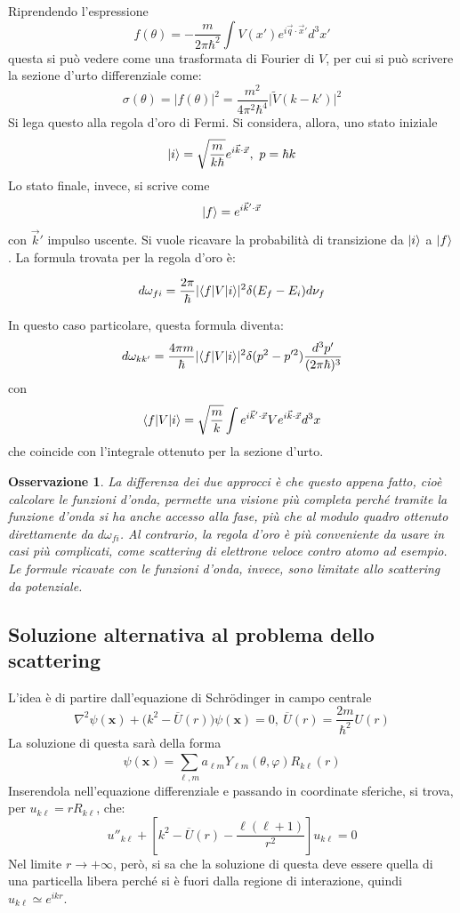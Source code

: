 \documentclass[11pt, a4paper]{scrartcl} %
\numberwithin{equation}{subsection}
\theoremstyle{style2}
\newtheorem{osservazione}{Osservazione}[section]
\theoremstyle{style1}
\newenvironment{boxenv}[1][]{
    \begin{eqbox}[#1]
    }{
   \end{eqbox}
}
\begin{document}
Riprendendo l'espressione
\[
f(\theta ) = - \frac{m}{2\pi \hbar ^2}\int V(x') e^{i \vec{q}\cdot \vec{x}'} d^3 x'
\] 
questa si pu\`o vedere come una trasformata di Fourier di $V$, per cui si pu\`o scrivere la sezione d'urto differenziale come:
\begin{equation}
	\sigma (\theta ) = \lvert f(\theta ) \rvert ^2 = \frac{m^2}{4 \pi ^2 \hbar ^4} \lvert \widetilde{V}(k-k') \rvert ^2
\end{equation}
Si lega questo alla regola d'oro di Fermi.
Si considera, allora, uno stato iniziale 
\[
\ket{i} = \sqrt{\frac{m}{k\hbar }} e^{i\vec{k}\cdot \vec{x}} , \ p = \hbar  k
\] 
Lo stato finale, invece, si scrive come
\[
\ket{f}  = e^{i \vec{k}' \cdot \vec{x}} 
\] 
con $\vec{k}'$ impulso uscente.
Si vuole ricavare la probabilit\`a di transizione da $\ket{i} $ a $\ket{f} $.
La formula trovata per la regola d'oro \`e:
\begin{boxenv}[]
\begin{equation}
d \omega_{fi} = \frac{2\pi}{\hbar }\lvert \braket{f|V|i}  \rvert ^2 \delta (E_f - E_i) d \nu _f
\end{equation}
\end{boxenv}
\noindent In questo caso particolare, questa formula diventa:
\begin{equation}\label{scop}
d \omega_{kk'}  = \frac{4\pi m }{\hbar } \lvert \braket{f|V|i}  \rvert ^2 \delta (p^2-p'^2) \frac{d^3 p'}{(2\pi \hbar )^3}
\end{equation}
con
\[
\braket{f|V|i}  = \sqrt{\frac{m}{k}} \int e^{i \vec{k}' \cdot \vec{x}} V e^{i\vec{k}\cdot \vec{x}} d^3 x
\] 
che coincide con l'integrale ottenuto per la sezione d'urto.
\begin{osservazione}
La differenza dei due approcci \`e che questo appena fatto, cio\`e calcolare le funzioni d'onda, permette una visione pi\`u completa perch\'e tramite la funzione d'onda si ha anche accesso alla fase, pi\`u che al modulo quadro ottenuto direttamente da $d\omega_{fi} $.
Al contrario, la regola d'oro \`e pi\`u conveniente da usare in casi pi\`u complicati, come scattering di elettrone veloce contro atomo ad esempio.
Le formule ricavate con le funzioni d'onda, invece, sono limitate allo scattering da potenziale.
\end{osservazione}
\subsection{Soluzione alternativa al problema dello scattering}
L'idea \`e di partire dall'equazione di Schr\"odinger in campo centrale
\[
\nabla ^2 \psi (\mathbf{x} ) + \big(k^2 - \overline{U}(r)\big) \psi (\mathbf{x} ) = 0, \ \overline{U}(r) = \frac{2m}{\hbar ^2}U(r)
\] 
La soluzione di questa sar\`a della forma
\[
\psi (\mathbf{x} ) = \sum_{\ell ,m}^{} a_{\ell m} Y_{\ell m} (\theta ,\varphi ) R_{k\ell } (r)
\] 
Inserendola nell'equazione differenziale e passando in coordinate sferiche, si trova, per $u _{k\ell } = r R_{k\ell } $, che:
\[
u'' _{k \ell } + \left[ k^2 - \overline{U}(r) - \frac{\ell (\ell +1)}{r^2} \right] u_{k\ell  } = 0 
\] 
Nel limite $r\to +\infty$, per\`o, si sa che la soluzione di questa deve essere quella di una particella libera perch\'e si \`e fuori dalla regione di interazione, quindi $u_{k\ell } \simeq e^{ik r}  $.
\end{document}
